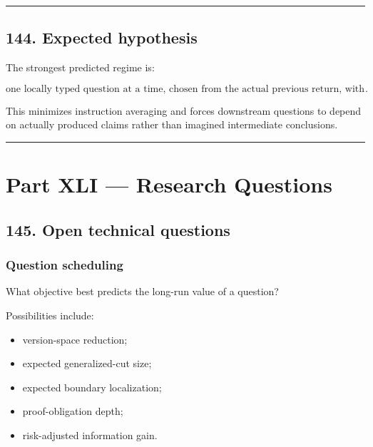 \documentclass[
]{article}
\providecommand{\tightlist}{%
  \setlength{\itemsep}{0pt}\setlength{\parskip}{0pt}}
\begin{document}
\begin{center}\rule{0.5\linewidth}{0.5pt}\end{center}

\subsection{144. Expected hypothesis}\label{expected-hypothesis}

The strongest predicted regime is:

\[
\boxed{
\text{one locally typed question at a time,
chosen from the actual previous return,
with external state retention and compression}.
}
\]

This minimizes instruction averaging and forces downstream questions to
depend on actually produced claims rather than imagined intermediate
conclusions.

\begin{center}\rule{0.5\linewidth}{0.5pt}\end{center}

\section{Part XLI --- Research
Questions}\label{part-xli-research-questions}

\subsection{145. Open technical
questions}\label{open-technical-questions}

\subsubsection{Question scheduling}\label{question-scheduling}

What objective best predicts the long-run value of a question?

Possibilities include:

\begin{itemize}
\tightlist
\item
  version-space reduction;
\item
  expected generalized-cut size;
\item
  expected boundary localization;
\item
  proof-obligation depth;
\item
  risk-adjusted information gain.
\end{itemize}
\end{document}
